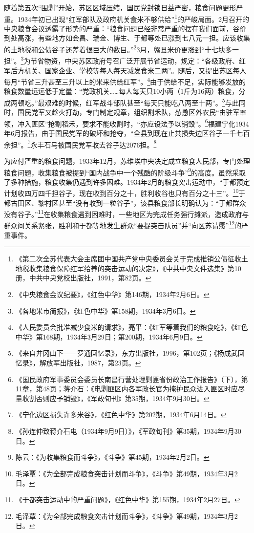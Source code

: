 随着第五次“围剿”开始，苏区区域压缩，国民党封锁日益严密，粮食问题更形严重。1934年初已出现“红军部队及政府机关食米不够供给”\footnote{《第二次全苏代表大会主席团中国共产党中央委员会关于完成推销公债征收土地税收集粮食保障红军给养的突击运动的决定》，《中共中央文件选集》第10册，中共中央党校出版社，1991，第82页。}的严峻局面。2月召开的中央粮食会议透露了形势的严重：“粮食问题已经非常严重的摆在我们面前，谷价到处高涨，有些地方如会昌、瑞金、博生、于都等处已涨到七八元一担。应该收集的土地税和公债谷子还差着很巨大的数目。”\footnote{《中央粮食会议纪要》，《红色中华》第146期，1934年2月6日。}3月，赣县米价更涨到“十七块多一担”。\footnote{《各地米市简报》，《红色中华》第158期，1934年3月6日。}为节省物资，中央苏区政府号召广泛开展节省运动，规定：“各级政府、红军后方机关、国家企业、学校等每人每天减发食米二两”。随后，又提出苏区每人每月“节省三升甚至三升以上的米来供给红军”。\footnote{《人民委员会批准减少食米的请求》，亮平：《红军等着我们的粮食吃》，《红色中华》第168期，1934年3月29日；第200期，1934年6月9日。}由于供给不足，实际能够发放的粮食数量远远低于定量：“党政机关……每人每天只10小两（1斤为16两）粮食，分成两顿吃。”最艰难的时候，红军战斗部队甚至“每天只能吃八两至十两”。\footnote{《来自井冈山下——罗通回忆录》，东方出版社，1996，第102页；《杨成武回忆录》，解放军出版社，1987，第23页。}与此同时，国民党军又趁火打劫，专门制定规章，组织割禾队，怂恿区外农民“由驻军率领，冲入匪区”抢割稻禾，要求不能收割时，“亦应设法予以销毁”。\footnote{《国民政府军事委员会委员长南昌行营处理剿匪省份政治工作报告》（下），第11章，第48页；蒋介石：《电剿匪区内各军政长官为掩护民众进入匪区时应尽量收割否则应予销毁》，《军政旬刊》第35期，1934年9月30日。}福建宁化1934年6月报告，由于国民党军的破坏和抢夺，“全县到现在止共损失边区谷子一千七百余担”。\footnote{《宁化边区损失许多米谷》，《红色中华》第202期，1934年6月14日。}永丰石马被国民党军收去谷子达2076担。\footnote{《孙连仲致蒋介石电（1934年9月9日）》，《军政旬刊》第35期，1934年9月30日。}


为应付严重的粮食问题，1933年12月，苏维埃中央决定成立粮食人民部，专门处理粮食问题，收集粮食被提到“国内战争中一个残酷的阶级斗争”\footnote{陈云：《为收集粮食而斗争》，《斗争》第45期，1934年2月2日。}的高度。虽然采取了多种措施，粮食收集仍遇到许多困难。1934年2月的粮食突击运动中，“于都预定计划收四万四千担谷子，现在收到百分之十，胜利收谷也只有百分之十三”。\footnote{毛泽覃：《为全部完成粮食突击计划而斗争》，《斗争》第49期，1934年3月2日。}于都古田区、黎村区甚至“没有收到一粒谷子”，该县粮食部长明确认为：“于都群众没有谷子。”\footnote{《于都突击运动中的严重问题》，《红色中华》第155期，1934年2月27日。}在收集粮食遇到困难时，一些地区为完成任务强行摊派，造成政府与群众间关系紧张，胜利和于都等地发生群众“要捉突击队员”并“向区苏请愿”\footnote{毛泽覃：《为全部完成粮食突击计划而斗争》，《斗争》第49期，1934年3月2日。}的严重事件。



